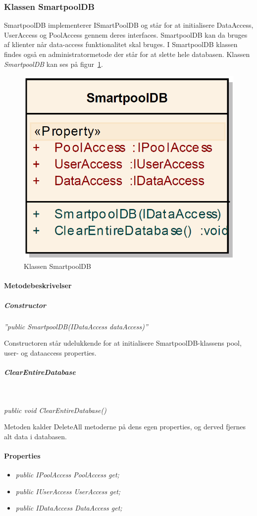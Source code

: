 \subsubsection{Klassen SmartpoolDB}
SmartpoolDB implementerer ISmartPoolDB og står for at initialisere DataAccess, UserAccess og PoolAccess gennem deres interfaces. SmartpoolDB kan da bruges af klienter når data-access funktionalitet skal bruges. I SmartpoolDB klassen findes også en administratormetode der står for at slette hele databasen. Klassen \textit{SmartpoolDB} kan ses på figur~\ref{fig:smartpoolDBClass}.

\begin{figure}[H]
\centering
\includegraphics[width=0.3\linewidth]{figs/implementering/smartpoolDBClass.PNG}
\caption{Klassen SmartpoolDB}
\label{fig:smartpoolDBClass}
\end{figure}

\paragraph{Metodebeskrivelser}
\subparagraph{Constructor}
\textit{''public SmartpoolDB(IDataAccess dataAccess)''}

Constructoren står udelukkende for at initialisere SmartpoolDB-klassens pool, user- og dataaccess properties.

\subparagraph{ClearEntireDatabase}\

\textit{public void ClearEntireDatabase()}

Metoden kalder DeleteAll metoderne på dens egen properties, og derved fjernes alt data i databasen.

\paragraph{Properties}

\begin{itemize}
	\item \textit{public IPoolAccess PoolAccess { get; }}
	\item \textit{public IUserAccess UserAccess { get; }}
	\item \textit{public IDataAccess DataAccess { get; }}
\end{itemize}





